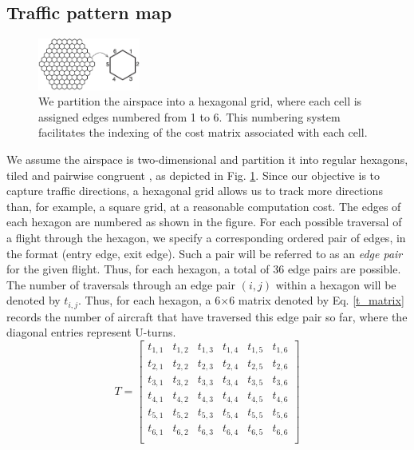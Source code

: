 \documentclass[conference, letter]{IEEEtran}
\begin{document}
\subsection{Traffic pattern map}\label{sec:map}
\begin{figure}[hbt!]
\centering
\includegraphics[width=0.3\textwidth]{hex2.png}
\caption{
We partition the airspace into a hexagonal grid, where each cell is assigned edges numbered from 1 to 6. This numbering system facilitates the indexing of the cost matrix associated with each cell.}
\label{hex}
\end{figure}
We assume the airspace is two-dimensional and partition it into regular hexagons, tiled and pairwise congruent \cite{patel}, as depicted in Fig. \ref{hex}. Since our objective is to capture traffic directions, a hexagonal grid allows us to track more directions than, for example, a square grid, at a reasonable computation cost. The edges of each hexagon are numbered as shown in the figure. For each possible traversal of a flight through the hexagon, we specify a corresponding ordered pair of edges, in the format (entry edge, exit edge). Such a pair will be referred to as an \textit{edge pair} for the given flight. Thus, for each hexagon, a total of 36 edge pairs are possible. The number of traversals through an edge pair $(i, j)$ within a hexagon will be denoted by $t_{i, j}$. Thus, for each hexagon, a 6$\times$6 matrix denoted by Eq. \ref{t_matrix} records the number of aircraft that have traversed this edge pair so far, where the diagonal entries represent U-turns. 
\begin{equation}
\label{t_matrix}
T = 
\begin{bmatrix}
    t_{1,1} & t_{1,2} & t_{1,3}& t_{1,4}& t_{1,5}& t_{1,6}\\
    t_{2,1} & t_{2,2} & t_{2,3}& t_{2,4}& t_{2,5}& t_{2,6}\\
    t_{3,1} & t_{3,2} & t_{3,3}& t_{3,4}& t_{3,5}& t_{3,6}\\
    t_{4,1} & t_{4,2} & t_{4,3}& t_{4,4}& t_{4,5}& t_{4,6}\\
    t_{5,1} & t_{5,2} & t_{5,3}& t_{5,4}& t_{5,5}& t_{5,6}\\
    t_{6,1} & t_{6,2} & t_{6,3}& t_{6,4}& t_{6,5}& t_{6,6}\\
\end{bmatrix}
\end{equation}
\end{document}
